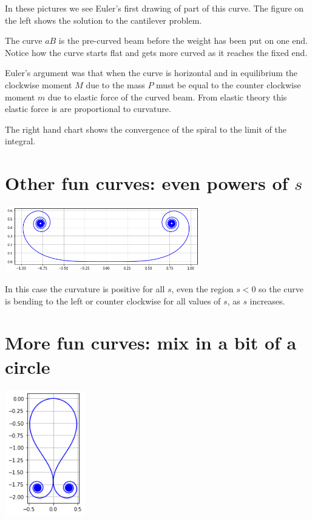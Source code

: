 \documentclass[]{article} %
\theoremstyle{definition}
\theoremstyle{theorem}
\begin{document}
In these pictures we see Euler's first drawing of part of this curve. The figure on the left shows the solution to the cantilever problem.

The curve $a B$ is the pre-curved beam before the weight has been put on one end. Notice how the curve starts flat and gets more curved as it reaches the fixed end.

Euler's argument was that when the curve is horizontal and in equilibrium the clockwise moment $M$ due to the mass $P$ must be equal to the counter clockwise moment $m$ due to elastic force of the curved beam. From elastic theory this elastic force is are proportional to curvature.

The right hand chart shows the convergence of the spiral to the limit of the integral.

\section{Other fun curves: even powers of $s$}
\begin{tcolorbox}
	\begin{minipage}{\linewidth}
	\centering
	\includegraphics[width=85mm, scale=0.5]{chaise_longue.png}
\end{minipage}
\end{tcolorbox}

In this case the curvature is positive for all $s$, even the region $s<0$ so the curve is bending to the left or counter clockwise for all values of $s$, as $s$ increases.

\section{More fun curves: mix in a bit of a circle}
\begin{tcolorbox}
	\begin{minipage}{\linewidth}
		\centering
		\includegraphics[width=35mm, scale=0.2]{s_squared_minus_219.png}
	\end{minipage}
\end{tcolorbox}
\end{document}
